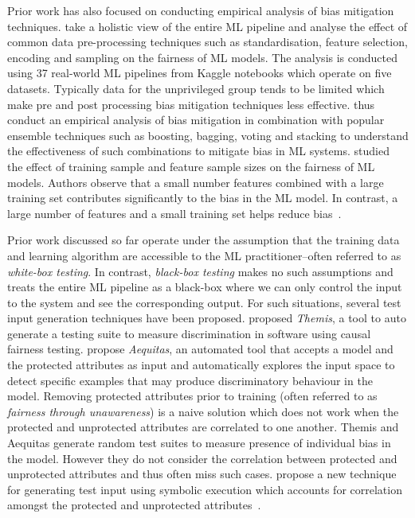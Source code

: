 \documentclass{article}
\begin{document}
Prior work has also focused on conducting empirical analysis of bias
mitigation techniques. \citeauthor{biswas2021fair} take a holistic
view of the entire ML pipeline and analyse the effect of common data
pre-processing techniques such as standardisation, feature selection,
encoding and sampling on the fairness of ML models. The analysis is
conducted using 37 real-world ML pipelines from Kaggle notebooks which
operate on five datasets. Typically data for the unprivileged group
tends to be limited which make pre and post processing bias mitigation
techniques less effective. \citeauthor{feffer2022empirical} thus
conduct an empirical analysis of bias mitigation in combination with
popular ensemble techniques such as boosting, bagging, voting and
stacking to understand the effectiveness of such combinations to
mitigate bias in ML systems. \citeauthor{zhang2021ignorance} studied
the effect of training sample and feature sample sizes on the fairness
of ML models. Authors observe that a small number features combined
with a large training set contributes significantly to the bias in the
ML model. In contrast, a large number of features and a small training
set helps reduce
bias \cite{biswas2021fair,feffer2022empirical,zhang2021ignorance}.

Prior work discussed so far operate under the assumption that the
training data and learning algorithm are accessible to the ML
practitioner--often referred to as \emph{white-box testing}. In
contrast, \emph{black-box testing} makes no such assumptions and
treats the entire ML pipeline as a black-box where we can only control
the input to the system and see the corresponding output. For such
situations, several test input generation techniques have been
proposed. \citeauthor{galhotra2017fairness} proposed \emph{Themis}, a
tool to auto generate a testing suite to measure discrimination in
software using causal fairness testing.
\citeauthor{udeshi2018automated} propose \emph{Aequitas}, an automated
tool that accepts a model and the protected attributes as input and
automatically explores the input space to detect specific examples
that may produce discriminatory behaviour in the model. Removing
protected attributes prior to training (often referred to as
\emph{fairness through unawareness}) is a naive solution which does
not work when the protected and unprotected attributes are correlated
to one another. Themis and Aequitas generate random test suites to
measure presence of individual bias in the model. However they do not
consider the correlation between protected and unprotected attributes
and thus often miss such cases. \citeauthor{aggarwal2019black} propose
a new technique for generating test input using symbolic execution
which accounts for correlation amongst the protected and unprotected
attributes \cite{aggarwal2019black,udeshi2018automated,galhotra2017fairness}.
\end{document}
